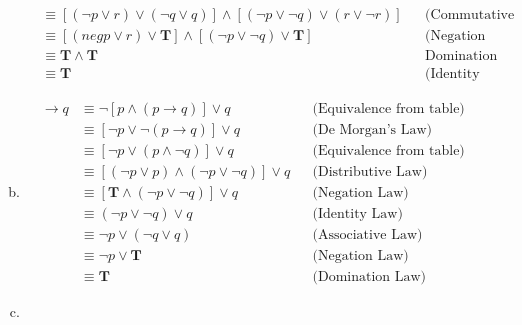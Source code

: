 \begin{itemize}
\begin{enumerate}[a.]
\begin{align*}
                         & \equiv [(\neg p \lor r) \lor (\neg q \lor q)] \land [(\neg p \lor \neg q) \lor (r \lor \neg r)] &  & \text{(Commutative \& Associative Law)} \\
                         & \equiv [(neg p \lor r) \lor \mathbf{T}] \land [(\neg p \lor \neg q) \lor \mathbf{T}]            &  & \text{(Negation Law)}                   \\
                         & \equiv \mathbf{T} \land \mathbf{T}                                                              &  & \text{Domination Law}                   \\
                         & \equiv \mathbf{T}                                                                               &  & \text{(Identity Law)}
                    \end{align*}
              \item \begin{align*}
                        [p \land (p \to q)] \to q
                         & \equiv \neg [p \land (p \to q)] \lor q                     &  & \text{(Equivalence from table)} \\
                         & \equiv [\neg p \lor \neg (p \to q)] \lor q                 &  & \text{(De Morgan’s Law)}        \\
                         & \equiv [\neg p \lor (p \land \neg q)] \lor q               &  & \text{(Equivalence from table)} \\
                         & \equiv [(\neg p \lor p) \land (\neg p \lor \neg q)] \lor q &  & \text{(Distributive Law)}       \\
                         & \equiv [\mathbf{T} \land (\neg p \lor \neg q)] \lor q      &  & \text{(Negation Law)}           \\
                         & \equiv (\neg p \lor \neg q) \lor q                         &  & \text{(Identity Law)}           \\
                         & \equiv \neg p \lor (\neg q \lor q)                         &  & \text{(Associative Law)}        \\
                         & \equiv \neg p \lor \mathbf{T}                              &  & \text{(Negation Law)}           \\
                         & \equiv \mathbf{T}                                          &  & \text{(Domination Law)}
                    \end{align*}
              \item \begin{align*}

\end{align*}
\end{enumerate}
\end{itemize}
